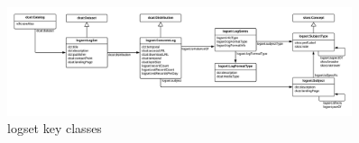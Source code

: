 \begin{figure}
\includegraphics[width=0.9\textwidth]{logset-key-classes.png}
\caption{logset key classes}
\end{figure}







